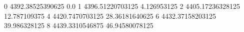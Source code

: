 0 4392.38525390625 0.0
1 4396.51220703125 4.126953125
2 4405.17236328125 12.787109375
4 4420.7470703125 28.36181640625
6 4432.37158203125 39.986328125
8 4439.3310546875 46.94580078125
